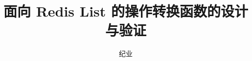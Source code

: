 \documentclass[bachelor,oneside,winfonts]{njuthesis}
\title{面向 Redis List 的操作转换函数的设计与验证}
\author{纪业}
\institute{南京大学}
\begin{document}
	
	\maketitle
	\makeenglishtitle
	
	\frontmatter
	
	
	
	\tableofcontents
	
	\mainmatter
	
	
	
	
	
	
	
	
	
	
\end{document}
